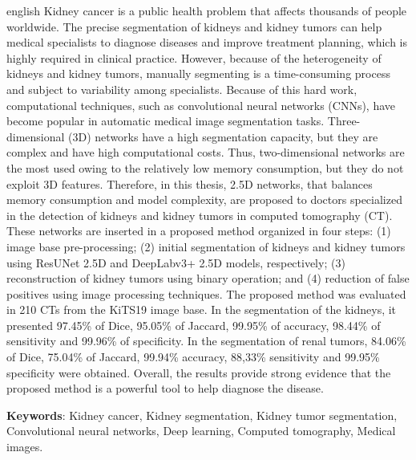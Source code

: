 \begin{resumo}[Abstract]
 \begin{otherlanguage*}{english}
Kidney cancer is a public health problem that affects thousands of people worldwide. The precise segmentation of kidneys and kidney tumors can help medical specialists to diagnose diseases and improve treatment planning, which is highly required in clinical practice. However, because of the heterogeneity of kidneys and kidney tumors, manually segmenting is a time-consuming process and subject to variability among specialists. Because of this hard work, computational techniques, such as convolutional neural networks (CNNs), have become popular in automatic medical image segmentation tasks. Three-dimensional (3D) networks have a high segmentation capacity, but they are complex and have high computational costs. Thus, two-dimensional networks are the most used owing to the relatively low memory consumption, but they do not exploit 3D features. Therefore, in this thesis, 2.5D networks, that balances memory consumption and model complexity, are proposed to doctors specialized in the detection of kidneys and kidney tumors in computed tomography (CT). These networks are inserted in a proposed method organized in four steps: (1) image base pre-processing; (2) initial segmentation of kidneys and kidney tumors using ResUNet 2.5D and DeepLabv3+ 2.5D models, respectively; (3) reconstruction of kidney tumors using binary operation; and (4) reduction of false positives using image processing techniques. The proposed method was evaluated in 210 CTs from the KiTS19 image base. In the segmentation of the kidneys, it presented 97.45\% of Dice, 95.05\% of Jaccard, 99.95\% of accuracy, 98.44\% of sensitivity and 99.96\% of specificity. In the segmentation of renal tumors, 84.06\% of Dice, 75.04\% of Jaccard, 99.94\% accuracy, 88,33\% sensitivity and 99.95\% specificity were obtained. Overall, the results provide strong evidence that the proposed method is a powerful tool to help diagnose the disease.

\textbf{Keywords}: Kidney cancer, Kidney segmentation, Kidney tumor segmentation, Convolutional neural networks, Deep learning, Computed tomography, Medical images.
 \end{otherlanguage*}
\end{resumo}